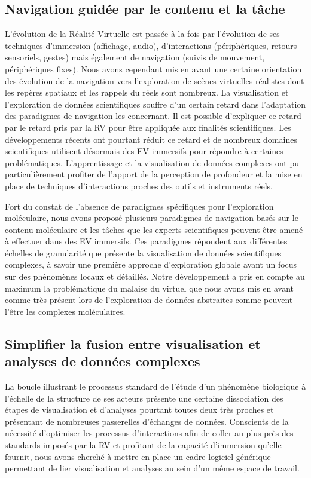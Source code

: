 \subsection*{Navigation guidée par le contenu et la tâche}

L'évolution de la Réalité Virtuelle est passée à la fois par l'évolution de ses techniques d'immersion (affichage, audio), d'interactions (périphériques, retours sensoriels, gestes) mais également de navigation (suivis de mouvement, périphériques fixes). 
Nous avons cependant mis en avant une certaine orientation des évolution de la navigation vers l'exploration de scènes virtuelles réalistes dont les repères spatiaux et les rappels du réels sont nombreux. La visualisation et l'exploration de données scientifiques souffre d'un certain retard dans l'adaptation des paradigmes de navigation les concernant. Il est possible d'expliquer ce retard par le retard pris par la RV pour être appliquée aux finalités scientifiques. Les développements récents ont pourtant réduit ce retard et de nombreux domaines scientifiques utilisent désormais des EV immersifs pour répondre à certaines problématiques. L'apprentissage et la visualisation de données complexes ont pu particulièrement profiter de l'apport de la perception de profondeur et la mise en place de techniques d'interactions proches des outils et instruments réels.

Fort du constat de l'absence de paradigmes spécifiques pour l'exploration moléculaire, nous avons proposé plusieurs paradigmes de navigation basés sur le contenu moléculaire et les tâches que les experts scientifiques peuvent être amené à effectuer dans des EV immersifs. Ces paradigmes répondent aux différentes échelles de granularité que présente la visualisation de données scientifiques complexes, à savoir une première approche d'exploration globale avant un focus sur des phénomènes locaux et détaillés. Notre développement a pris en compte au maximum la problématique du malaise du virtuel que nous avons mis en avant comme très présent lors de l'exploration de données abstraites comme peuvent l'être les complexes moléculaires.

\subsection*{Simplifier la fusion entre visualisation et analyses de données complexes}

La boucle illustrant le processus standard de l'étude d'un phénomène biologique à l'échelle de la structure de ses acteurs présente une certaine dissociation des étapes de visualisation et d'analyses pourtant toutes deux très proches et présentant de nombreuses passerelles d'échanges de données. Conscients de la nécessité d'optimiser les processus d'interactions afin de coller au plus près des standards imposés par la RV et profitant de la capacité d'immersion qu'elle fournit, nous avons cherché à mettre en place un cadre logiciel générique permettant de lier visualisation et analyses au sein d'un même espace de travail.

